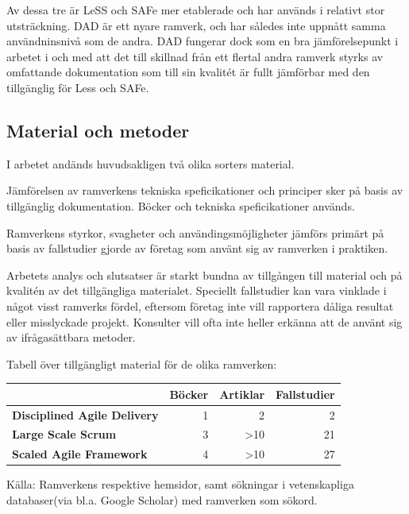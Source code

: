 	Av dessa tre är LeSS och SAFe mer etablerade och har används i relativt stor utsträckning. DAD är ett nyare ramverk, och har således inte uppnått samma användninsnivå som de andra. DAD fungerar dock som en bra jämförelsepunkt i arbetet i och med att det till skillnad från ett flertal andra ramverk styrks av omfattande dokumentation som till sin kvalitét är fullt jämförbar med den tillgänglig för Less och SAFe. \cite{ask_matrix}
	
	
	\subsection{Material och metoder}
	I arbetet andänds huvudsakligen två olika sorters material.
	
	Jämförelsen av ramverkens tekniska speficikationer och principer sker på basis av tillgänglig dokumentation. Böcker och tekniska speficikationer används.
	\linebreak
	
	Ramverkens styrkor, svagheter och användingsmöjligheter jämförs primärt på basis av fallstudier gjorde av företag som använt sig av ramverken i praktiken.
	
	
	
	Arbetets analys och slutsatser är starkt bundna av tillgången till material och på kvalitén av det tillgängliga materialet. Speciellt fallstudier kan vara vinklade i något visst ramverks fördel, eftersom företag inte vill rapportera dåliga resultat eller misslyckade projekt. Konsulter vill ofta inte heller erkänna att de använt sig av ifrågasättbara metoder.
	
	
	Tabell över tillgängligt material för de olika ramverken:

	\begin{center}
	\begin{tabular}{ >{\bfseries}l | r | r | r }
		 	 						& Böcker & Artiklar & Fallstudier 	\\ \hline
		Disciplined Agile Delivery 	& 1 	& 2			& 2 			\\ \hline
		Large Scale Scrum 			& 3 	& >10		& 21 			\\ \hline
		Scaled Agile Framework 		& 4 	& >10		& 27 			\\ 
	\end{tabular}
	\end{center}
	
	Källa: Ramverkens respektive hemsidor\cite{dad_web, less_web, safe_web}, samt sökningar i vetenskapliga databaser(via bl.a. Google Scholar) med ramverken som sökord.
	
